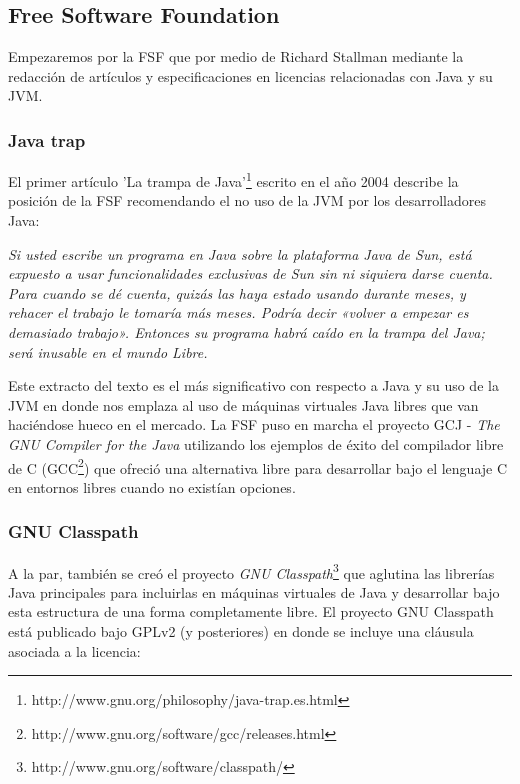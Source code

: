 \documentclass[11pt]{scrartcl}
\begin{document}
\subsection{Free Software Foundation}

Empezaremos por la FSF que por medio de Richard Stallman mediante la redacción de artículos y especificaciones en licencias relacionadas con Java y su JVM.

\subsubsection{Java trap}

El primer artículo 'La trampa de Java'\footnote{http://www.gnu.org/philosophy/java-trap.es.html} escrito en el año 2004 describe la posición de la FSF recomendando el no uso de la JVM por los desarrolladores Java:

    \emph{Si usted escribe un programa en Java sobre la plataforma Java de Sun, está expuesto a usar funcionalidades exclusivas de Sun sin ni siquiera darse cuenta. Para cuando se dé cuenta, quizás las haya estado usando durante meses, y rehacer el trabajo le tomaría más meses. Podría decir «volver a empezar es demasiado trabajo». Entonces su programa habrá caído en la trampa del Java; será inusable en el mundo Libre.}
    
Este extracto del texto es el más significativo con respecto a Java y su uso de la JVM en donde nos emplaza al uso de máquinas virtuales Java libres que van haciéndose hueco en el mercado.
La FSF puso en marcha el proyecto GCJ - \emph{The GNU Compiler for the Java} utilizando los ejemplos de éxito del compilador libre de C (GCC\footnote{http://www.gnu.org/software/gcc/releases.html}) que ofreció una alternativa libre para desarrollar bajo el lenguaje C en entornos libres cuando no existían opciones.

\subsubsection{GNU Classpath}

A la par, también se creó el proyecto \emph{GNU Classpath}\footnote{http://www.gnu.org/software/classpath/} que aglutina las librerías Java principales para incluirlas en máquinas virtuales de Java y desarrollar bajo esta estructura de una forma completamente libre.
El proyecto GNU Classpath está publicado bajo GPLv2 (y posteriores) en donde se incluye una cláusula asociada a la licencia:
\end{document}
